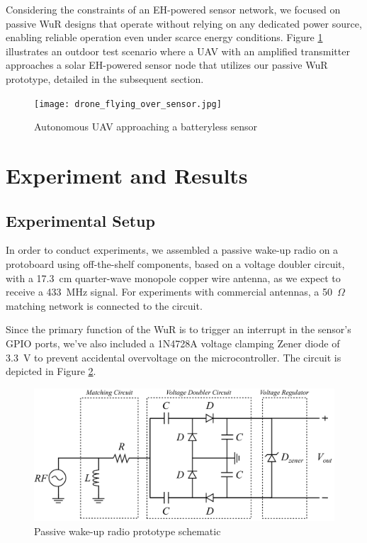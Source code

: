 \documentclass[conference]{IEEEtran}
\begin{document}
Considering the constraints of an EH-powered sensor network, we focused on passive WuR designs that operate without relying on any dedicated power source, enabling reliable operation even under scarce energy conditions. Figure \ref{fig:drone_over_sensor} illustrates an outdoor test scenario where a UAV with an amplified transmitter approaches a solar EH-powered sensor node that utilizes our passive WuR prototype, detailed in the subsequent section.

\begin{figure}[htbp]
  \centerline{\texttt{[image: drone\_flying\_over\_sensor.jpg]}}
  \caption{Autonomous UAV approaching a batteryless sensor}
  \label{fig:drone_over_sensor}
\end{figure}

\section{Experiment and Results}

\subsection{Experimental Setup}

In order to conduct experiments, we assembled a passive wake-up radio on a protoboard using off-the-shelf components, based on a voltage doubler circuit, with a 17.3~cm quarter-wave monopole copper wire antenna, as we expect to receive a 433~MHz signal. For experiments with commercial antennas, a 50~$\Omega$ matching network is connected to the circuit.

Since the primary function of the WuR is to trigger an interrupt in the sensor's GPIO ports, we've also included a 1N4728A voltage clamping Zener diode of 3.3~V to prevent accidental overvoltage on the microcontroller. The circuit is depicted in Figure \ref{fig:receiver}.

\begin{figure}[htbp]
  \centerline{\includegraphics[width=1\linewidth]{receiver.png}}
  \caption{Passive wake-up radio prototype schematic}
  \label{fig:receiver}
\end{figure}
\end{document}
